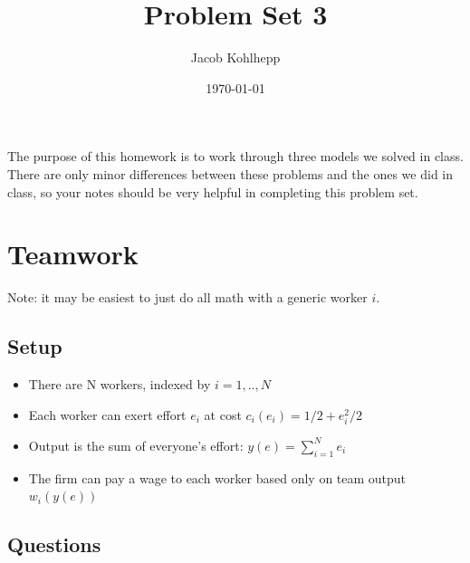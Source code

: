 \documentclass{article}
\title{Problem Set 3}
\author{Jacob Kohlhepp}
\date{\today}
\begin{document}
\maketitle

The purpose of this homework is to work through three models we solved in class. There are only minor differences between these problems and the ones we did in class, so your notes should be very helpful in completing this problem set.



\section{Teamwork}

Note: it may be easiest to just do all math with a generic worker $i$.

\subsection{Setup}
\begin{itemize}
    \item There are N workers, indexed by $i=1,..,N$
    \item Each worker can exert effort $e_i$ at cost $c_i(e_i)=1/2+e_i^2/2$
    \item Output is the sum of everyone's effort: $y(e)=\sum_{i=1}^N e_i$
    \item The firm can pay a wage to each worker based only on team output $w_i(y(e))$
\end{itemize}

\subsection{Questions}
\end{document}
